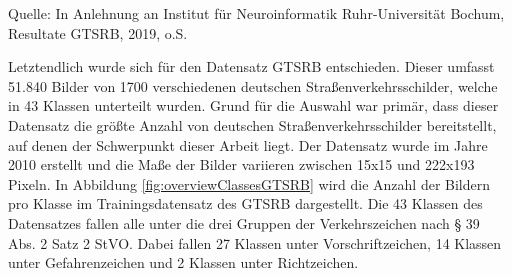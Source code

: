 \begin{table}[t]
    
    \caption{Übersicht der höchsten erreichten Genauigkeiten auf den GTSRB Datensatz\label{table:TopGTRSBPaper}}
    
    \hfill \break
    Quelle: In Anlehnung an Institut für Neuroinformatik Ruhr-Universität Bochum, Resultate GTSRB, 2019, o.S.
\end{table} 
Letztendlich wurde sich für den Datensatz \ac{GTSRB} entschieden. Dieser umfasst 51.840 Bilder von 1700 verschiedenen deutschen Straßenverkehrsschilder, welche in 43 Klassen unterteilt wurden. Grund für die Auswahl war primär, dass dieser Datensatz die größte Anzahl von deutschen Straßenverkehrsschilder bereitstellt, auf denen  der Schwerpunkt dieser Arbeit liegt. Der Datensatz wurde im Jahre 2010 erstellt und die Maße der Bilder variieren zwischen 15x15 und 222x193 Pixeln. In Abbildung \ref{fig:overviewClassesGTSRB} wird die Anzahl der Bildern pro Klasse im Trainingsdatensatz des \ac{GTSRB} dargestellt. Die 43 Klassen des Datensatzes fallen alle unter die drei Gruppen der Verkehrszeichen nach § 39 Abs. 2 Satz 2 \ac{StVO}. Dabei fallen 27 Klassen unter Vorschriftzeichen, 14 Klassen unter Gefahrenzeichen und 2 Klassen unter Richtzeichen. 

